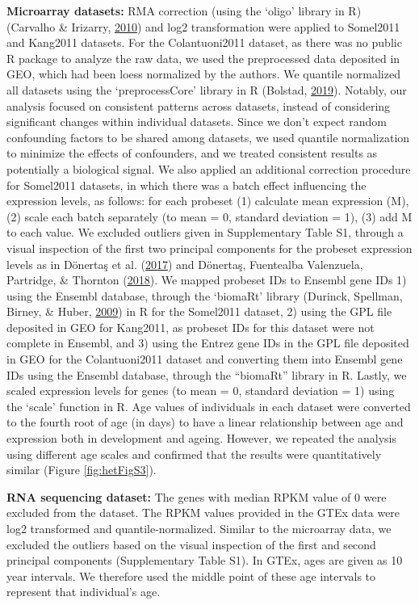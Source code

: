 \documentclass[12pt,twoside]{unicam}
\begin{document}
\textbf{Microarray datasets:} RMA correction (using the `oligo' library in R) (Carvalho \& Irizarry, \protect\hyperlink{ref-Carvalho2010}{2010}) and log2 transformation were applied to Somel2011 and Kang2011 datasets. For the Colantuoni2011 dataset, as there was no public R package to analyze the raw data, we used the preprocessed data deposited in GEO, which had been loess normalized by the authors. We quantile normalized all datasets using the `preprocessCore' library in R (Bolstad, \protect\hyperlink{ref-Bolstad2019}{2019}). Notably, our analysis focused on consistent patterns across datasets, instead of considering significant changes within individual datasets. Since we don't expect random confounding factors to be shared among datasets, we used quantile normalization to minimize the effects of confounders, and we treated consistent results as potentially a biological signal. We also applied an additional correction procedure for Somel2011 datasets, in which there was a batch effect influencing the expression levels, as follows: for each probeset (1) calculate mean expression (M), (2) scale each batch separately (to mean = 0, standard deviation = 1), (3) add M to each value. We excluded outliers given in Supplementary Table S1, through a visual inspection of the first two principal components for the probeset expression levels as in Dönertaş et al. (\protect\hyperlink{ref-Donertas2017}{2017}) and Dönertaş, Fuentealba Valenzuela, Partridge, \& Thornton (\protect\hyperlink{ref-Donertas2018}{2018}). We mapped probeset IDs to Ensembl gene IDs 1) using the Ensembl database, through the `biomaRt' library (Durinck, Spellman, Birney, \& Huber, \protect\hyperlink{ref-Durinck2009}{2009}) in R for the Somel2011 dataset, 2) using the GPL file deposited in GEO for Kang2011, as probeset IDs for this dataset were not complete in Ensembl, and 3) using the Entrez gene IDs in the GPL file deposited in GEO for the Colantuoni2011 dataset and converting them into Ensembl gene IDs using the Ensembl database, through the ``biomaRt'' library in R. Lastly, we scaled expression levels for genes (to mean = 0, standard deviation = 1) using the `scale' function in R. Age values of individuals in each dataset were converted to the fourth root of age (in days) to have a linear relationship between age and expression both in development and ageing. However, we repeated the analysis using different age scales and confirmed that the results were quantitatively similar (Figure \ref{fig:hetFigS3}).

\textbf{RNA sequencing dataset:} The genes with median RPKM value of 0 were excluded from the dataset. The RPKM values provided in the GTEx data were log2 transformed and quantile-normalized. Similar to the microarray data, we excluded the outliers based on the visual inspection of the first and second principal components (Supplementary Table S1). In GTEx, ages are given as 10 year intervals. We therefore used the middle point of these age intervals to represent that individual's age.
\end{document}
